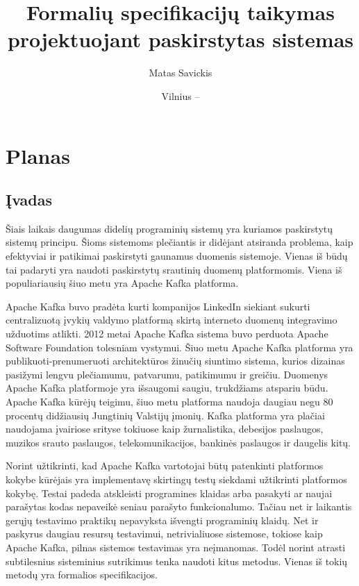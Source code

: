 \documentclass{VUMIFPSmagistrinis}
\title{Formalių specifikacijų taikymas projektuojant paskirstytas sistemas}
\author{Matas Savickis}
\date{Vilnius – \the\year}
\begin{document}
\maketitle

\tableofcontents
\section{Planas}
	\subsection{Įvadas}

		Šiais laikais daugumas didelių programinių sistemų yra kuriamos paskirstytų sistemų principu.
		Šioms sistemoms plečiantis ir didėjant atsiranda problema, kaip efektyviai ir patikimai paskirstyti gaunamus duomenis sistemoje.
		Vienas iš būdų tai padaryti yra naudoti paskirstytų srautinių duomenų platformomis.
		Viena iš populiariausių šiuo metu yra Apache Kafka platforma.


 		Apache Kafka buvo pradėta kurti kompanijos LinkedIn siekiant sukurti centralizuotą įvykių valdymo platformą skirtą interneto duomenų integravimo užduotims atlikti.
		2012 metai Apache Kafka sistema buvo perduota Apache Software Foundation tolesniam vystymui.
		Šiuo metu Apache Kafka platforma yra publikuoti-prenumeruoti architektūros žinučių siuntimo sistema, kurios dizainas pasižymi lengvu plečiamumu, patvarumu, patikimumu ir greičiu.
		Duomenys Apache Kafka platformoje yra išsaugomi saugiu, trukdžiams atspariu būdu.
		Apache Kafka kūrėjų teigimu, šiuo metu platforma naudoja daugiau negu 80 procentų didžiausių Jungtinių Valstijų įmonių.
		Kafka platforma yra plačiai naudojama įvairiose srityse tokiuose kaip žurnalistika, debesijos paslaugos, muzikos srauto paslaugos, telekomunikacijos, bankinės paslaugos ir daugelis kitų.


		Norint užtikrinti, kad Apache Kafka vartotojai būtų patenkinti platformos kokybe kūrėjais yra implementavę skirtingų testų siekdami užtikrinti platformos kokybę.
		Testai padeda atskleisti programines klaidas arba pasakyti ar naujai parašytas kodas nepaveikė seniau parašyto funkcionalumo.
		Tačiau net ir laikantis gerųjų testavimo praktikų nepavyksta išvengti programinių klaidų.
		Net ir paskyrus daugiau resursų testavimui, netrivialiuose sistemose, tokiose kaip Apache Kafka, pilnas sistemos testavimas yra neįmanomas.
		Todėl norint atrasti subtilesnius sisteminius sutrikimus tenka naudoti kitus metodus.
		Vienas iš tokių metodų yra formalios specifikacijos.
\end{document}
